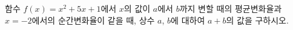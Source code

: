 함수 $f(x)=x^2+5x+1$에서 $x$의 값이 $a$에서 $b$까지 변할 때의 평균변화율과 $x=-2$에서의 순간변화율이 같을 때, 상수 $a$, $b$에 대하여 $a+b$의 값을 구하시오.
